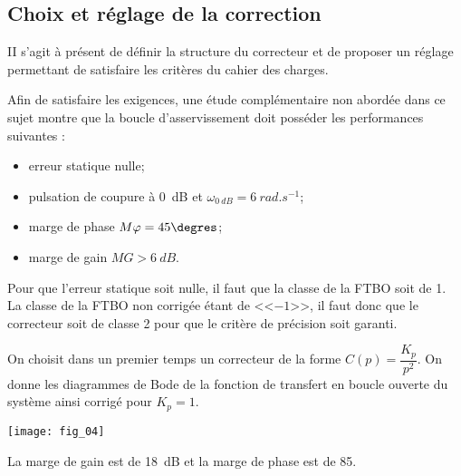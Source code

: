 \begin{multicols}{2}
\begin{multicols}{2}
\subsection*{Choix et réglage de la correction}
\begin{obj}
II s'agit à présent de définir la structure du correcteur et de proposer un réglage permettant de satisfaire les critères du cahier des charges.
\end{obj}
\ifprof
\else
Afin de satisfaire les exigences, une étude complémentaire non abordée dans ce sujet montre que la boucle d'asservissement doit posséder les performances suivantes :
\begin{itemize}
\item erreur statique nulle;
\item pulsation de coupure à \SI{0}{dB} et $\omega_{\SI{0}{dB}}= \SI{6}{rad.s^{-1}}$;
\item marge de phase $M\varphi = 45\degres$;
\item marge de gain $MG > \SI{6}{dB}$.
\end{itemize}
\fi

\ifprof
\begin{corrige}
Pour que l'erreur statique soit nulle, il faut que la classe de la FTBO soit de 1. La classe de la FTBO non corrigée étant de <<$-1$>>, il faut donc que le correcteur soit de classe 2 pour que le critère de précision soit garanti.
\end{corrige}
\else
\fi

\ifprof
\else
On choisit dans un premier temps un correcteur de la forme $C(p)=\dfrac{K_p}{p^2}$. On donne les diagrammes de Bode de la fonction de transfert en boucle ouverte du système ainsi corrigé pour $K_p =1$. 

\begin{center}
\texttt{[image: fig\_04]}
\end{center}

\fi

\ifprof
\begin{corrige}
La marge de gain est de \SI{18}{dB} et la marge de phase est de 85\degres. 


\end{corrige}
\end{multicols}
\end{multicols}
